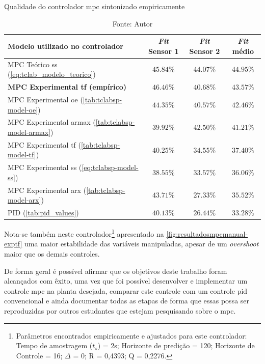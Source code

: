 \begin{table}[!h]
	\centering
	\caption{Qualidade do controlador \acrshort{mpc} sintonizado empiricamente}
	\label{tab:resultados_mpc_e_pid_e_manual}
	\begin{tabular}{l|cc|c} \toprule
		{Modelo utilizado no controlador}              			            &	{\textit{Fit} Sensor 1}	    &	{\textit{Fit} Sensor 2}     & {\textit{Fit} médio}			    \\ \midrule
		MPC Teórico \acrshort{ss} (\cref{eq:tclab_modelo_teorico})	        &   $45.84\%$                   &   $44.07\%$                   &   $44.95\%$                       \\ 
		\textbf{MPC Experimental \acrshort{tf} (empírico)}                  &   $\mathbf{46.46\%}$          &   $\mathbf{40.68\%}$          &   $\mathbf{43.57\%}$              \\ 
		MPC Experimental \acrshort{oe} (\cref{tab:tclabsp-model-oe})	    &   $44.35\%$                   &   $40.57\%$                   &   $42.46\%$                       \\ 
		MPC Experimental \acrshort{armax} (\cref{tab:tclabsp-model-armax})	&   $39.92\%$                   &   $42.50\%$                   &   $41.21\%$                       \\ 
		MPC Experimental \acrshort{tf} (\cref{tab:tclabsp-model-tf})		&   $40.25\%$                   &   $34.55\%$                   &   $37.40\%$                       \\ 
		MPC Experimental \acrshort{ss} (\cref{eq:tclabsp-model-ss})			&   $38.55\%$                   &   $33.57\%$                   &   $36.06\%$                       \\ 
		MPC Experimental \acrshort{arx}	(\cref{tab:tclabsp-model-arx})		&   $43.71\%$                   &   $27.33\%$                   &   $35.52\%$                       \\ 
		PID (\cref{tab:pid_values})	                                        &   $40.13\%$                   &   $26.44\%$                   &   $33.28\%$                       \\ \bottomrule 
	\end{tabular}
	\caption*{Fonte: Autor}
\end{table}

Nota-se também neste controlador\footnote{
    Parâmetros encontrados empiricamente e ajustados para este controlador: Tempo de amostragem ($t_s$) = 2s; Horizonte de predição = 120;
    Horizonte de Controle = 16; $\Delta$ = 0; R = 0,4393; Q = 0,2276.
} apresentado na \cref{fig:resultadosmpcmanual-exptf} uma maior estabilidade
das variáveis manipuladas, apesar de um \textit{overshoot} maior que os demais controles.

De forma geral é possível afirmar que os objetivos deste trabalho foram alcançados com êxito, uma vez que foi
possível desenvolver e implementar um controle \acrshort{mpc} na planta desejada, comparar este controle 
com um controle \acrshort{pid} convencional e ainda documentar todas as etapas de forma que essas possa ser reproduzidas
por outros estudantes que estejam pesquisando sobre o \acrlong{mpc}.